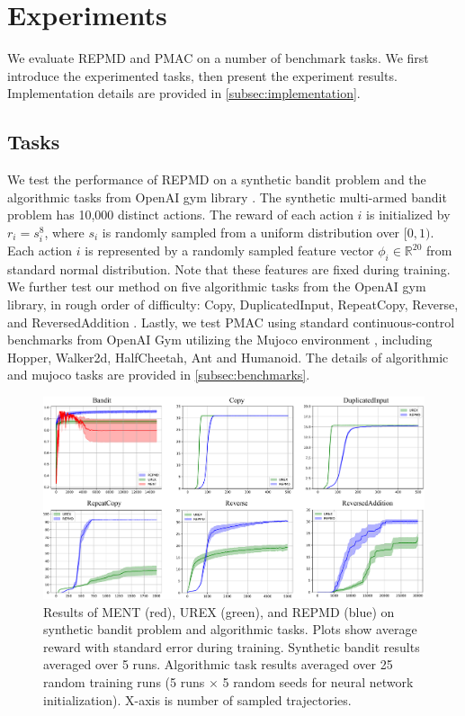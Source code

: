 
\section{Experiments}
We evaluate REPMD and PMAC on a number of benchmark tasks. We first introduce the experimented tasks, then present the experiment results. Implementation details are provided in \cref{subsec:implementation}. 

\subsection{Tasks}
\label{subsec:tasks}
We test the performance of REPMD on a synthetic bandit problem and the algorithmic tasks from OpenAI gym library \citep{brockman2016openai}. The synthetic multi-armed bandit problem has 10,000 distinct actions. The reward of each action $i$ is initialized by $r_i = s_i^{8}$, where $s_i$ is randomly sampled from a uniform distribution over $[0,1)$. Each action $i$ is represented by a randomly sampled feature vector $\phi_i\in \mathbb{R}^{20}$ from standard normal distribution. Note that these features are fixed during training. We further test our method on five algorithmic tasks from the OpenAI gym library, in rough order of difficulty: Copy, DuplicatedInput, RepeatCopy, Reverse, and ReversedAddition \citep{brockman2016openai}. Lastly, we test PMAC using standard continuous-control benchmarks from OpenAI Gym utilizing the Mujoco environment \citep{brockman2016openai,todorov2012mujoco}, including Hopper, Walker2d, HalfCheetah, Ant and Humanoid. The details of algorithmic and mujoco tasks are provided in \cref{subsec:benchmarks}. 

\begin{figure}[t]
\begin{center}
\includegraphics[width=0.8\linewidth]{./fig1.pdf}
\end{center}
\caption{
Results of MENT (red), UREX (green), and REPMD (blue) on synthetic bandit problem and algorithmic tasks. Plots show average reward with standard error during training. Synthetic bandit results averaged over 5 runs. Algorithmic task results averaged over 25 random training runs (5 runs $\times$ 5 random seeds for neural network initialization). X-axis is number of sampled trajectories. } 
\label{fig:results}
\end{figure}

